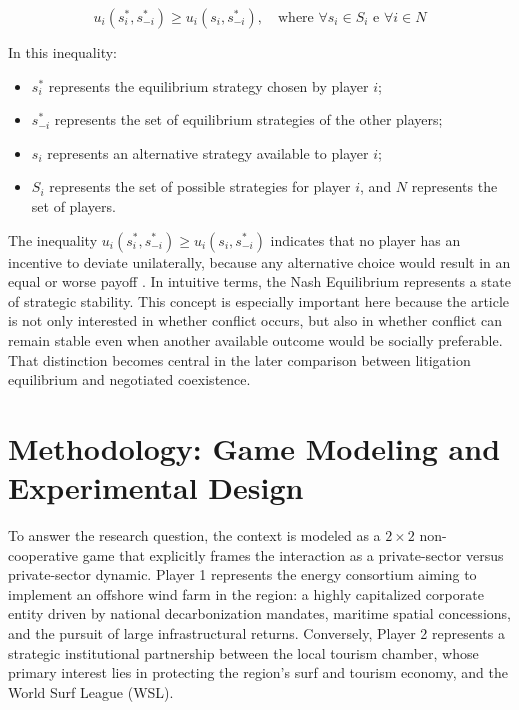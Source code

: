 \documentclass[final,times,authoryear]{elsarticle}
\newcommand{\verify}[1]{{\color{blue} {#1}}}
\begin{document}
    \begin{equation}
    u_i(s_i^\ast, s_{-i}^\ast) \geq u_i(s_i, s_{-i}^\ast), \quad \text{where } \forall s_i \in S_i \text{ e } \forall i \in N
    \end{equation}

In this inequality:

    \begin{itemize}
    \item $s_i^\ast$ represents the equilibrium strategy chosen by player $i$;
    \item $s_{-i}^\ast$ represents the set of equilibrium strategies of the other players;
    \item $s_i$ represents an alternative strategy available to player $i$;
    \item $S_i$ represents the set of possible strategies for player $i$, and $N$ represents the set of players.
    \end{itemize}

The inequality $u_i(s_i^\ast, s_{-i}^\ast) \geq u_i(s_i, s_{-i}^\ast) $ indicates that no player has an incentive to deviate unilaterally, because any alternative choice would result in an equal or worse payoff \citep{pianezzer2023}. In intuitive terms, the Nash Equilibrium represents a state of strategic stability. This concept is especially important here because the article is not only interested in whether conflict occurs, but also in whether conflict can remain stable even when another available outcome would be socially preferable. That distinction becomes central in the later comparison between litigation equilibrium and negotiated coexistence.

\section{Methodology: Game Modeling and Experimental Design}

To answer the research question, the context is modeled as a $2\times2$ non-cooperative game that explicitly frames the interaction as a private-sector versus private-sector dynamic. Player 1 represents the energy consortium aiming to implement an offshore wind farm in the region: a highly capitalized corporate entity driven by national decarbonization mandates, maritime spatial concessions, and the pursuit of large infrastructural returns. Conversely, \verify{Player 2 represents a strategic institutional partnership between the local tourism chamber, whose primary interest lies in protecting the region's surf and tourism economy, and the World Surf League (WSL).}
\end{document}
